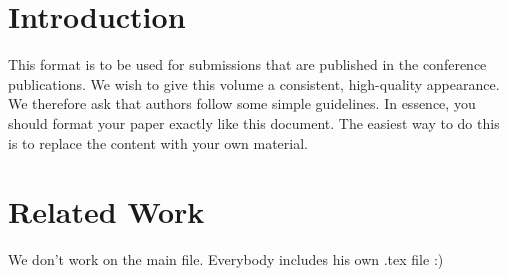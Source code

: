 \documentclass[sigchi-a, authorversion]{acmart}
\begin{document}

\maketitle

  
  
  




\section{Introduction}
This format is to be used for submissions that are published in the
conference publications. We wish to give this volume a consistent,
high-quality appearance. We therefore ask that authors follow some
simple guidelines. In essence, you should format your paper exactly
like this document. The easiest way to do this is to replace the
content with your own material.


\section{Related Work}
We don't work on the main file. Everybody includes his own .tex file :)
 
 






\end{document}
